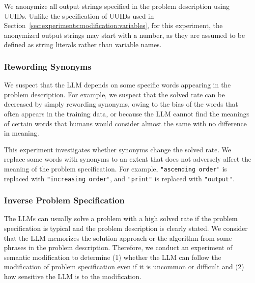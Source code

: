\documentclass{article}
\begin{document}
We anonymize all output strings specified in the problem description using UUIDs.
Unlike the specification of UUIDs used in Section~\ref{sec:experiments:modification:variables}, for this experiment, the anonymized output strings may start with a number, as they are assumed to be defined as string literals rather than variable names.








\subsubsection{Rewording Synonyms}
\label{sec:experiments:modification:synonyms}

We suspect that the LLM depends on some specific words appearing in the problem description.
For example, we suspect that the solved rate can be decreased by simply rewording synonyms, owing to the bias of the words that often appears in the training data, or because the LLM cannot find the meanings of certain words that humans would consider almost the same with no difference in meaning.

This experiment investigates whether synonyms change the solved rate.
We replace some words with synonyms to an extent that does not adversely affect the meaning of the problem specification.
For example, \texttt{"ascending order"} is replaced with \texttt{"increasing order"}, and \texttt{"print"} is replaced with \texttt{"output"}.





\subsubsection{Inverse Problem Specification}
\label{sec:experiments:modification:inverse}

The LLMs can usually solve a problem with a high solved rate if the problem specification is typical and the problem description is clearly stated.
We consider that the LLM memorizes the solution approach or the algorithm from some phrases in the problem description.
Therefore, we conduct an experiment of semantic modification to determine
(1) whether the LLM can follow the modification of problem specification even if it is uncommon or difficult and
(2) how sensitive the LLM is to the modification.
\end{document}
